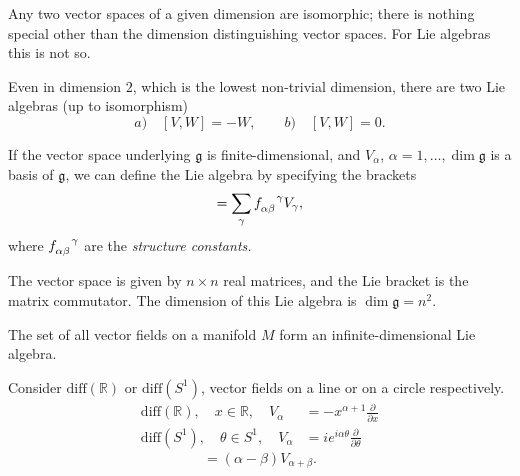 
Any two vector spaces of a given dimension are isomorphic; there is nothing special other than the dimension distinguishing vector spaces.
For Lie algebras this is not so.
\begin{example}[]
  Even in dimension $2$, which is the lowest non-trivial dimension, there are two Lie algebras (up to isomorphism)
  \begin{equation}
    a) \quad [V, W] = -W, \qquad b) \quad [V, W] = 0.
  \end{equation}
\end{example}

If the vector space underlying $\mathfrak{g}$ is finite-dimensional, and $V_{\alpha}$, $\alpha = 1, \dots, \dim \mathfrak{g}$  is a basis of $\mathfrak{g}$, we can define the Lie algebra by specifying the brackets
\begin{equation}
  [V_{\alpha}, V_{\beta}] = \sum_{\gamma} f\indices{_{\alpha\beta}^{\gamma}} V_{\gamma}, 
\end{equation}
where $f\indices{_{\alpha\beta}^{\gamma}}$  are the \emph{structure constants.}

\begin{example}[$\mathfrak{g} = \mathfrak{gl}(n, \mathbb{R})$]
  The vector space is given by $n \times n$ real matrices, and the Lie bracket is the matrix commutator.
  The dimension of this Lie algebra is $\dim \mathfrak{g} = n^2$.
\end{example}

\begin{example}
  The set of all vector fields on a manifold $M$ form an infinite-dimensional Lie algebra.
\end{example}

\begin{example}[]
  Consider $\text{diff}(\mathbb{R})$ or $\text{diff}(S^1)$, vector fields on a line or on a circle respectively.
  \begin{align}
    \text{diff}(\mathbb{R}),\quad x \in \mathbb{R}, \quad V_{\alpha} &= -x^{\alpha + 1} \frac{\partial }{\partial x} \\
    \text{diff}(S^1), \quad \theta \in S^1, \quad V_{\alpha} &= i e^{i \alpha \theta} \frac{\partial }{\partial \theta}
  \end{align}
  \begin{equation}
    [V_{\alpha}, V_{\beta}] = (\alpha - \beta) V_{\alpha + \beta}.
  \end{equation}
\end{example}

